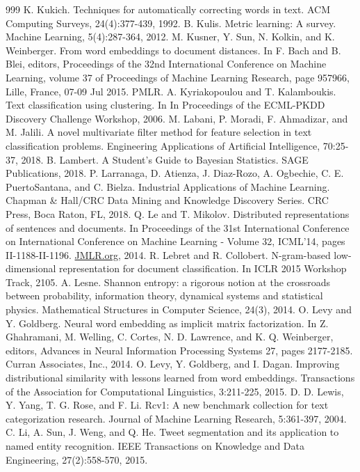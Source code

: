 \documentclass[11pt,openany,executivepaper]{book}
\begin{document}
\begin{thebibliography}{999}
 K. Kukich. Techniques for automatically correcting words in text. ACM Computing Surveys, 24(4):377-439, 1992.
 B. Kulis. Metric learning: A survey. Machine Learning, 5(4):287-364, 2012.
 M. Kusner, Y. Sun, N. Kolkin, and K. Weinberger. From word embeddings to document distances. In F. Bach and B. Blei, editors, Proceedings of the 32nd International Conference on Machine Learning, volume 37 of Proceedings of Machine Learning Research, page 957966, Lille, France, 07-09 Jul 2015. PMLR.
 A. Kyriakopoulou and T. Kalamboukis. Text classification using clustering. In In Proceedings of the ECML-PKDD Discovery Challenge Workshop, 2006.
 M. Labani, P. Moradi, F. Ahmadizar, and M. Jalili. A novel multivariate filter method for feature selection in text classification problems. Engineering Applications of Artificial Intelligence, 70:25-37, 2018.
 B. Lambert. A Student's Guide to Bayesian Statistics. SAGE Publications, 2018.
 P. Larranaga, D. Atienza, J. Diaz-Rozo, A. Ogbechie, C. E. PuertoSantana, and C. Bielza. Industrial Applications of Machine Learning. Chapman \& Hall/CRC Data Mining and Knowledge Discovery Series. CRC Press, Boca Raton, FL, 2018.
 Q. Le and T. Mikolov. Distributed representations of sentences and documents. In Proceedings of the 31st International Conference on International Conference on Machine Learning - Volume 32, ICML'14, pages II-1188-II-1196. \href{http://JMLR.org}{JMLR.org}, 2014.
 R. Lebret and R. Collobert. N-gram-based low-dimensional representation for document classification. In ICLR 2015 Workshop Track, 2105.
 A. Lesne. Shannon entropy: a rigorous notion at the crossroads between probability, information theory, dynamical systems and statistical physics. Mathematical Structures in Computer Science, 24(3), 2014.
 O. Levy and Y. Goldberg. Neural word embedding as implicit matrix factorization. In Z. Ghahramani, M. Welling, C. Cortes, N. D. Lawrence, and K. Q. Weinberger, editors, Advances in Neural Information Processing Systems 27, pages 2177-2185. Curran Associates, Inc., 2014.
 O. Levy, Y. Goldberg, and I. Dagan. Improving distributional similarity with lessons learned from word embeddings. Transactions of the Association for Computational Linguistics, 3:211-225, 2015.
 D. D. Lewis, Y. Yang, T. G. Rose, and F. Li. Rcv1: A new benchmark collection for text categorization research. Journal of Machine Learning Research, 5:361-397, 2004.
 C. Li, A. Sun, J. Weng, and Q. He. Tweet segmentation and its application to named entity recognition. IEEE Transactions on Knowledge and Data Engineering, 27(2):558-570, 2015.

\end{thebibliography}
\end{document}
